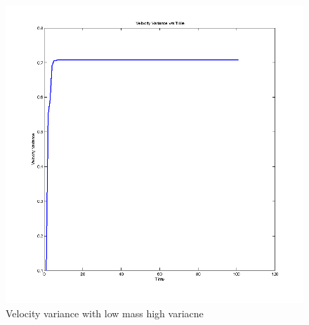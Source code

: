 \documentclass[12pt]{article}
\begin{document}
\begin{figure}
    \includegraphics[width=\linewidth]{kalman-variance2-m1h}
    \caption{Velocity variance with low mass high variacne}
\end{figure}
\end{document}

